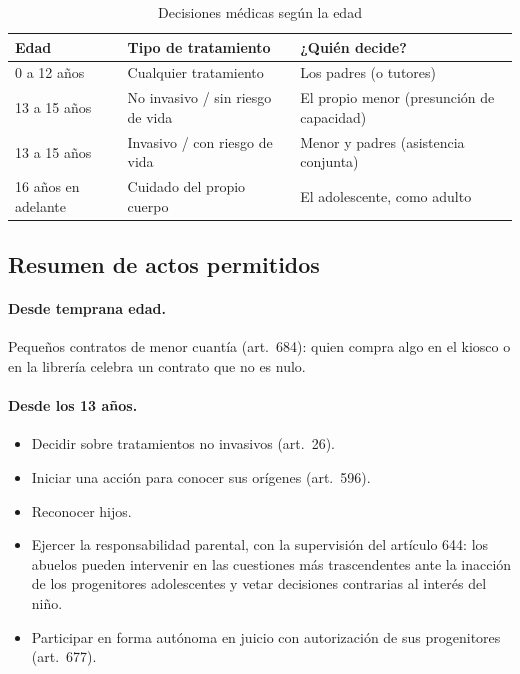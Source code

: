 \documentclass[12pt,oneside]{book}
\begin{document}
\begin{table}[H]
\centering
\begin{tabularx}{\textwidth}{B{0.20\textwidth} Y Y}
\toprule
\textbf{Edad} & \textbf{Tipo de tratamiento} & \textbf{¿Quién decide?} \\
 a 12 años & Cualquier tratamiento & Los padres (o tutores) \\
13 a 15 años & No invasivo / sin riesgo de vida & El propio menor (presunción de capacidad) \\
13 a 15 años & Invasivo / con riesgo de vida & Menor y padres (asistencia conjunta) \\
16 años en adelante & Cuidado del propio cuerpo & El adolescente, como adulto \\
\bottomrule
\end{tabularx}
\caption{Decisiones médicas según la edad}
\end{table}

\subsection{Resumen de actos permitidos}

\paragraph{Desde temprana edad.} Pequeños contratos de menor cuantía (art.~684): quien compra algo en el kiosco o en la librería celebra un contrato que no es nulo.

\paragraph{Desde los 13 años.}

\begin{itemize}
\item Decidir sobre tratamientos no invasivos (art.~26).
\item Iniciar una acción para conocer sus orígenes (art.~596).
\item Reconocer hijos.
\item Ejercer la responsabilidad parental, con la supervisión del artículo 644: los abuelos pueden intervenir en las cuestiones más trascendentes ante la inacción de los progenitores adolescentes y vetar decisiones contrarias al interés del niño.
\item Participar en forma autónoma en juicio con autorización de sus progenitores (art.~677).
\end{itemize}
\end{document}
